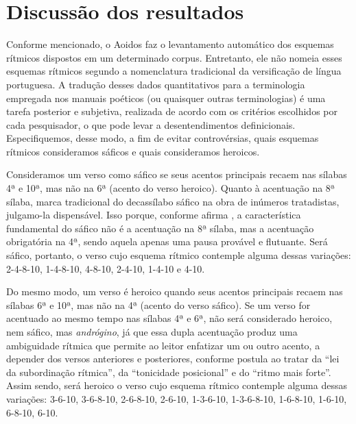\documentclass[portuguese]{textolivre}
\begin{document}
\section{Discussão dos resultados}\label{sec-conduta}
Conforme mencionado, o Aoidos faz o levantamento automático dos esquemas rítmicos dispostos em um determinado corpus. Entretanto, ele não nomeia esses esquemas rítmicos segundo a nomenclatura tradicional da versificação de língua portuguesa. A tradução desses dados quantitativos para a terminologia empregada nos manuais poéticos (ou quaisquer outras terminologias) é uma tarefa posterior e subjetiva, realizada de acordo com os critérios escolhidos por cada pesquisador, o que pode levar a desentendimentos definicionais. Especifiquemos, desse modo, a fim de evitar controvérsias, quais esquemas rítmicos consideramos sáficos e quais consideramos heroicos.

Consideramos um verso como sáfico se seus acentos principais recaem nas sílabas 4ª e 10ª, mas não na 6ª (acento do verso heroico). Quanto à acentuação na 8ª sílaba, marca tradicional do decassílabo sáfico na obra de inúmeros tratadistas, julgamo-la dispensável. Isso porque, conforme afirma \textcite[p.~58]{proenca1955ritmo}, a característica fundamental do sáfico não é a acentuação na 8ª sílaba, mas a acentuação obrigatória na 4ª, sendo aquela apenas uma pausa provável e flutuante. Será sáfico, portanto, o verso cujo esquema rítmico contemple alguma dessas variações: 2-4-8-10, 1-4-8-10, 4-8-10, 2-4-10, 1-4-10 e 4-10.

Do mesmo modo, um verso é heroico quando seus acentos principais recaem nas sílabas 6ª e 10ª, mas não na 4ª (acento do verso sáfico). Se um verso for acentuado ao mesmo tempo nas sílabas 4ª e 6ª, não será considerado heroico, nem sáfico, mas \textit{andrógino}, já que essa dupla acentuação produz uma ambiguidade rítmica que permite ao leitor enfatizar um ou outro acento, a depender dos versos anteriores e posteriores, conforme postula \textcite{carvalho1987teoria} ao tratar da “lei da subordinação rítmica”, da “tonicidade posicional” e do “ritmo mais forte”. Assim sendo, será heroico o verso cujo esquema rítmico contemple alguma dessas variações: 3-6-10, 3-6-8-10, 2-6-8-10, 2-6-10, 1-3-6-10, 1-3-6-8-10, 1-6-8-10, 1-6-10, 6-8-10, 6-10. 
\end{document}

